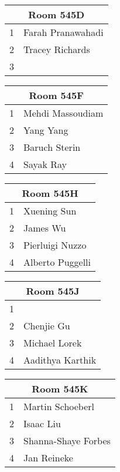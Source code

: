 \documentclass{article}
\begin{document}
\Huge
\bfseries

\noindent
\begin{tabular}{|l|l|}
\hline
\multicolumn{2}{|c|}{Room 545D} \\ \hline\hline
1&Farah Pranawahadi\\
2&Tracey Richards\\
3& \\

\hline
\end{tabular}
\vspace{1in}

\noindent
\begin{tabular}{|l|l|}
\hline
\multicolumn{2}{|c|}{Room 545F} \\ \hline\hline
1&Mehdi Massoudiam\\
2&Yang Yang\\
3&Baruch Sterin\\
4&Sayak Ray\\

\hline
\end{tabular}
\vspace{1in}

\noindent
\begin{tabular}{|l|l|}
\hline
\multicolumn{2}{|c|}{Room 545H} \\ \hline\hline
1&Xuening Sun\\
2&James Wu\\
3&Pierluigi Nuzzo\\
4&Alberto Puggelli\\

\hline
\end{tabular}
\vspace{1in}

\noindent
\begin{tabular}{|l|l|}
\hline
\multicolumn{2}{|c|}{Room 545J} \\ \hline\hline
1& \\
2&Chenjie Gu\\
3&Michael Lorek\\
4&Aadithya Karthik\\

\hline
\end{tabular}
\vspace{1in}

\noindent
\begin{tabular}{|l|l|}
\hline
\multicolumn{2}{|c|}{Room 545K} \\ \hline\hline
1&Martin Schoeberl\\
2&Isaac Liu\\
3&Shanna-Shaye Forbes\\
4&Jan Reineke\\

\hline
\end{tabular}
\vspace{1in}
\end{document}
